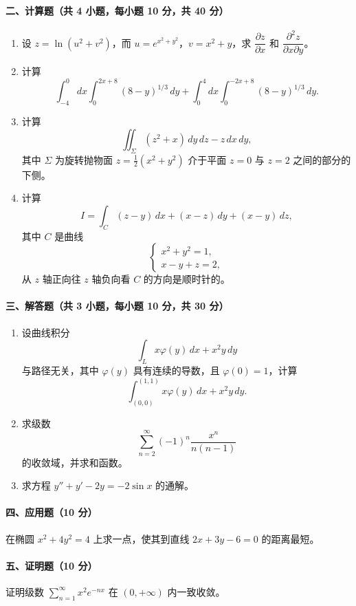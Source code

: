 \paragraph*{二、计算题（共 4 小题，每小题 10 分，共 40 分）}
\begin{enumerate}
  \item 设 $z=\ln(u^2+v^2)$，而 $u=e^{x^2+y^2}$，$v=x^2+y$，求 $\dfrac{\partial z}{\partial x}$ 和 $\dfrac{\partial^2z}{\partial x\partial y}$。
  \item 计算
  \[
    \int_{-4}^0 dx\int_0^{2x+8}(8-y)^{1/3}\,dy
    +\int_0^4 dx\int_0^{-2x+8}(8-y)^{1/3}\,dy .
  \]
  \item 计算
  \[
    \iint_\Sigma (z^2+x)\,dy\,dz-z\,dx\,dy,
  \]
  其中 $\Sigma$ 为旋转抛物面 $z=\frac12(x^2+y^2)$ 介于平面 $z=0$ 与 $z=2$ 之间的部分的下侧。
  \item 计算
  \[
    I=\int_C (z-y)\,dx+(x-z)\,dy+(x-y)\,dz,
  \]
  其中 $C$ 是曲线
  \[
    \begin{cases}
      x^2+y^2=1,\\
      x-y+z=2,
    \end{cases}
  \]
  从 $z$ 轴正向往 $z$ 轴负向看 $C$ 的方向是顺时针的。
\end{enumerate}

\paragraph*{三、解答题（共 3 小题，每小题 10 分，共 30 分）}
\begin{enumerate}
  \item 设曲线积分
  \[
    \int_L x\varphi(y)\,dx+x^2y\,dy
  \]
  与路径无关，其中 $\varphi(y)$ 具有连续的导数，且 $\varphi(0)=1$，计算
  \[
    \int_{(0,0)}^{(1,1)}x\varphi(y)\,dx+x^2y\,dy.
  \]
  \item 求级数
  \[
    \sum_{n=2}^\infty (-1)^n\frac{x^n}{n(n-1)}
  \]
  的收敛域，并求和函数。
  \item 求方程 $y''+y'-2y=-2\sin x$ 的通解。
\end{enumerate}

\paragraph*{四、应用题（10 分）}
在椭圆 $x^2+4y^2=4$ 上求一点，使其到直线 $2x+3y-6=0$ 的距离最短。

\paragraph*{五、证明题（10 分）}
证明级数 $\displaystyle \sum_{n=1}^\infty x^2e^{-nx}$ 在 $(0,+\infty)$ 内一致收敛。

